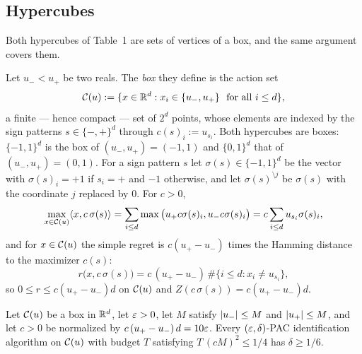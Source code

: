 \subsection{Hypercubes}
\label{sec:log_gains_lower_hypercubes}

Both hypercubes of Table~1 are sets of vertices of a box, and the same argument covers them.

\begin{definition}\label{def:cube_set}
\leanok
{}
Let $u_- < u_+$ be two reals. The \emph{box} they define is the action set
\[
  \mathcal{C}(u) := \{x \in \mathbb{R}^d : x_i \in \{u_-, u_+\}\ \text{ for all } i \le d\},
\]
a finite --- hence compact --- set of $2^d$ points, whose elements are indexed by the sign
patterns $s \in \{-,+\}^d$ through $c(s)_i := u_{s_i}$. Both hypercubes are boxes:
$\{-1,1\}^d$ is the box of $(u_-,u_+) = (-1,1)$ and $\{0,1\}^d$ that of $(u_-,u_+) = (0,1)$.
For a sign pattern $s$ let $\sigma(s) \in \{-1,1\}^d$ be the vector with $\sigma(s)_i = +1$ if
$s_i = +$ and $-1$ otherwise, and let $\sigma(s)^{\setminus j}$ be $\sigma(s)$ with the
coordinate $j$ replaced by $0$. For $c > 0$,
\[
  \max_{x\in\mathcal{C}(u)}\langle x, c\,\sigma(s) \rangle = \sum_{i\le d}\max\big(u_+c\sigma(s)_i, u_-c\sigma(s)_i\big)
  = c\sum_{i\le d}u_{s_i}\sigma(s)_i ,
\]
and for $x \in \mathcal{C}(u)$ the simple regret is $c(u_+-u_-)$ times the Hamming distance to the
maximizer $c(s)$:
\[
  r\big(x, c\,\sigma(s)\big) = c\,(u_+ - u_-)\,\#\{i \le d : x_i \ne u_{s_i}\} ,
\]
so $0 \le r \le c(u_+-u_-)d$ on $\mathcal{C}(u)$ and $Z(c\,\sigma(s)) = c(u_+-u_-)d$.
\end{definition}

\begin{lemma}\label{lem:lower_cube}
\leanok
{}
Let $\mathcal{C}(u)$ be a box in $\mathbb{R}^d$, let $\varepsilon > 0$, let $M$ satisfy
$\lvert u_- \rvert \le M$ and $\lvert u_+ \rvert \le M$, and let $c > 0$ be normalized by
$c\,(u_+-u_-)\,d = 10\varepsilon$. Every $(\varepsilon,\delta)$-PAC identification algorithm on
$\mathcal{C}(u)$ with budget $T$ satisfying $T\,(cM)^2 \le 1/4$ has $\delta \ge 1/6$.
\end{lemma}

